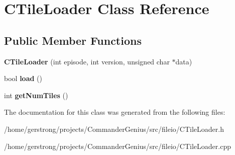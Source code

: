 \hypertarget{class_c_tile_loader}{
\section{CTileLoader Class Reference}
\label{class_c_tile_loader}
}
\subsection*{Public Member Functions}
\begin{DoxyCompactItemize}
\item 
\hypertarget{class_c_tile_loader_afd55fdee4f8441050edb43e5c406ae7a}{
{\bfseries CTileLoader} (int episode, int version, unsigned char $\ast$data)}
\label{class_c_tile_loader_afd55fdee4f8441050edb43e5c406ae7a}

\item 
\hypertarget{class_c_tile_loader_acf09b42ddf302bc1fe21d1213e9e4e98}{
bool {\bfseries load} ()}
\label{class_c_tile_loader_acf09b42ddf302bc1fe21d1213e9e4e98}

\item 
\hypertarget{class_c_tile_loader_a6f4a191167cdb5b66e22d29deeda70ac}{
int {\bfseries getNumTiles} ()}
\label{class_c_tile_loader_a6f4a191167cdb5b66e22d29deeda70ac}

\end{DoxyCompactItemize}


The documentation for this class was generated from the following files:\begin{DoxyCompactItemize}
\item 
/home/gerstrong/projects/CommanderGenius/src/fileio/CTileLoader.h\item 
/home/gerstrong/projects/CommanderGenius/src/fileio/CTileLoader.cpp\end{DoxyCompactItemize}
